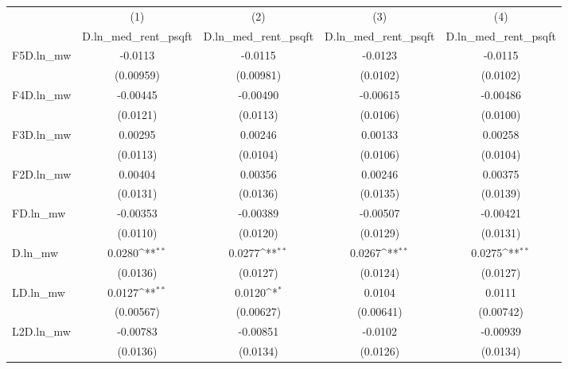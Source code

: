 {
\def\sym#1{\ifmmode^{#1}\else\(^{#1}\)\fi}
\begin{tabular}{l*{4}{c}}
\hline\hline
          &\multicolumn{1}{c}{(1)}&\multicolumn{1}{c}{(2)}&\multicolumn{1}{c}{(3)}&\multicolumn{1}{c}{(4)}\\
          &\multicolumn{1}{c}{D.ln\_med\_rent\_psqft}&\multicolumn{1}{c}{D.ln\_med\_rent\_psqft}&\multicolumn{1}{c}{D.ln\_med\_rent\_psqft}&\multicolumn{1}{c}{D.ln\_med\_rent\_psqft}\\
\hline
F5D.ln\_mw &  -0.0113         &  -0.0115         &  -0.0123         &  -0.0115         \\
          &(0.00959)         &(0.00981)         & (0.0102)         & (0.0102)         \\
[1em]
F4D.ln\_mw & -0.00445         & -0.00490         & -0.00615         & -0.00486         \\
          & (0.0121)         & (0.0113)         & (0.0106)         & (0.0100)         \\
[1em]
F3D.ln\_mw &  0.00295         &  0.00246         &  0.00133         &  0.00258         \\
          & (0.0113)         & (0.0104)         & (0.0106)         & (0.0104)         \\
[1em]
F2D.ln\_mw &  0.00404         &  0.00356         &  0.00246         &  0.00375         \\
          & (0.0131)         & (0.0136)         & (0.0135)         & (0.0139)         \\
[1em]
FD.ln\_mw  & -0.00353         & -0.00389         & -0.00507         & -0.00421         \\
          & (0.0110)         & (0.0120)         & (0.0129)         & (0.0131)         \\
[1em]
D.ln\_mw   &   0.0280\sym{**} &   0.0277\sym{**} &   0.0267\sym{**} &   0.0275\sym{**} \\
          & (0.0136)         & (0.0127)         & (0.0124)         & (0.0127)         \\
[1em]
LD.ln\_mw  &   0.0127\sym{**} &   0.0120\sym{*}  &   0.0104         &   0.0111         \\
          &(0.00567)         &(0.00627)         &(0.00641)         &(0.00742)         \\
[1em]
L2D.ln\_mw & -0.00783         & -0.00851         &  -0.0102         & -0.00939         \\
          & (0.0136)         & (0.0134)         & (0.0126)         & (0.0134)         \\

\end{tabular}}
